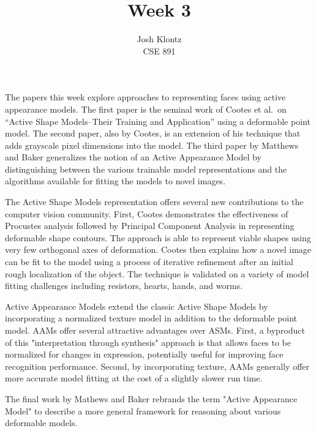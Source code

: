 \documentclass[12pt]{article}
\begin{document}
 
 
\title{Week 3}%
\author{Josh Klontz\\ %
CSE 891} %
 
\maketitle
 
The papers this week explore approaches to representing faces using active appearance models.
The first paper is the seminal work of Cootes et al.\ on ``Active Shape Models--Their Training and Application'' using a deformable point model.
The second paper, also by Cootes, is an extension of his technique that adds grayscale pixel dimensions into the model.
The third paper by Matthews and Baker generalizes the notion of an Active Appearance Model by distinguishing between the various trainable model representations and the algorithms available for fitting the models to novel images.
\par
The Active Shape Models representation offers several new contributions to the computer vision community.
First, Cootes demonstrates the effectiveness of Procustes analysis followed by Principal Component Analysis in representing deformable shape contours.
The approach is able to represent viable shapes using very few orthogonal axes of deformation.
Cootes then explains how a novel image can be fit to the model using a process of iterative refinement after an initial rough localization of the object.
The technique is validated on a variety of model fitting challenges including resistors, hearts, hands, and worms.
\par
Active Appearance Models extend the classic Active Shape Models by incorporating a normalized texture model in addition to the deformable point model.
AAMs offer several attractive advantages over ASMs.
First, a byproduct of this "interpretation through synthesis" approach is that allows faces to be normalized for changes in expression, potentially useful for improving face recognition performance.
Second, by incorporating texture, AAMs generally offer more accurate model fitting at the cost of a slightly slower run time.
\par
The final work by Mathews and Baker rebrands the term "Active Appearance Model" to describe a more general framework for reasoning about various deformable models.
\end{document}
